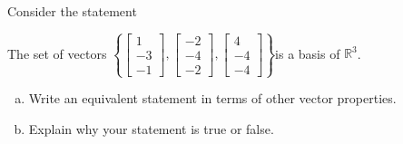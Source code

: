 
\begin{exerciseStatement}


Consider the statement 
\begin{center}\begin{minipage}{0.8\textwidth}
 The set of vectors \( \left\{ \left[\begin{array}{c}
1 \\
-3 \\
-1
\end{array}\right] , \left[\begin{array}{c}
-2 \\
-4 \\
-2
\end{array}\right] , \left[\begin{array}{c}
4 \\
-4 \\
-4
\end{array}\right] \right\} \)is a basis of \(\mathbb{R}^3\). 
\end{minipage}\end{center}
    


\begin{enumerate}[(a)]
\item  Write an equivalent statement in terms of other vector properties.
\item  Explain why your statement is true or false.
\end{enumerate}
    
\end{exerciseStatement}
    

